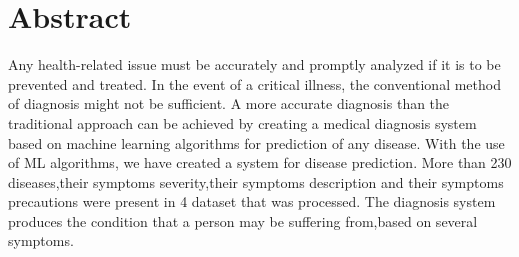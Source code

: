\section*{Abstract}
Any health-related issue must be accurately and promptly analyzed 
if it is to be prevented and treated. In the event of a critical illness, 
the conventional method of diagnosis might not be sufficient.
 A more accurate diagnosis than the traditional approach can be achieved by 
 creating a medical diagnosis system based on machine learning algorithms 
 for prediction of any disease. With the use of ML algorithms,
  we have created a system for disease prediction. 
  More than 230 diseases,their symptoms severity,their symptoms description and their symptoms precautions
   were present in 4 dataset that was processed. 
  The diagnosis system produces the condition that a person may be suffering 
  from,based on several symptoms.

\vspace{.5cm}
\newpage